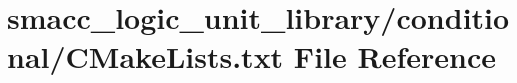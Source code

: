 \hypertarget{logic__unit__library_2conditional_2CMakeLists_8txt}{}\section{smacc\+\_\+logic\+\_\+unit\+\_\+library/conditional/\+C\+Make\+Lists.txt File Reference}
\label{logic__unit__library_2conditional_2CMakeLists_8txt}

